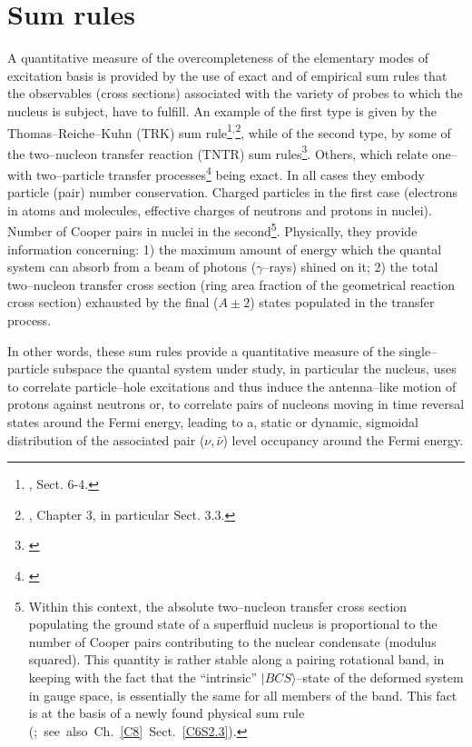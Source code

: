 \section{Sum rules}\label{C1S2}
A quantitative measure of the overcompleteness of  the elementary modes of excitation basis is provided by the use of exact and of empirical sum rules that the observables (cross sections) associated with the variety of probes to which the nucleus is subject, have to fulfill. An example of the first type  is given by the Thomas--Reiche--Kuhn (TRK) sum rule\footnote{\cite{Bohr:75}, Sect. 6-4.}$^,$\footnote{\cite{Bertsch:05}, Chapter 3, in particular Sect. 3.3.}, while of the second type, by some of the two--nucleon transfer reaction (TNTR) sum rules\footnote{\cite{Broglia:72b}}. Others, which relate one-- with two--particle transfer processes\footnote{\cite{Bayman:72,Lanford:77}} being exact. In all cases they embody particle (pair) number conservation. Charged particles in the first case (electrons in atoms and molecules, effective charges of neutrons and protons in nuclei). Number of Cooper pairs in nuclei in the second\footnote{Within this context, the absolute two--nucleon transfer cross section populating the ground state of a superfluid nucleus is proportional to the number of Cooper pairs contributing to the nuclear condensate (modulus squared). This quantity is rather stable along a pairing rotational band, in keeping with the fact that the ``intrinsic'' $|BCS\rangle$--state of the deformed system in gauge space, is essentially the same for all members of the band. This fact is at the basis of a newly found physical sum rule \mbox{(\cite{Potel:17}; see also Ch.  \ref{C8} Sect. \ref{C6S2.3})}.}. Physically, they provide  information concerning: 1) the maximum amount of energy which the quantal system can absorb from a beam of photons ($\gamma$--rays) shined on it; 2) the total two--nucleon transfer cross section (ring area fraction of the geometrical reaction cross section) exhausted by the final ($A\pm2$) states populated in the transfer process.







In other words, these sum rules provide a quantitative measure of the single--particle subspace the quantal system under study, in particular the nucleus, uses to correlate particle--hole excitations and thus induce the antenna--like motion of protons against neutrons or, to correlate pairs of nucleons moving in time reversal states around the Fermi energy, leading to a, static or dynamic, sigmoidal distribution of the associated pair ($\nu,\bar{\nu}$) level occupancy around the Fermi energy. 



